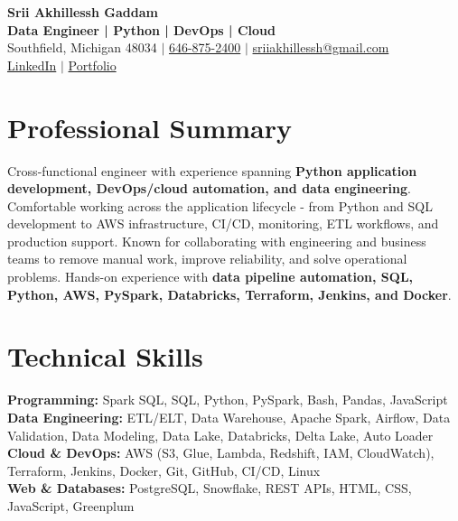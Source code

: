 \documentclass[letterpaper,10pt]{article}
\begin{document}
\fontsize{9.35pt}{10.45pt}\selectfont

\begin{center}
    {\LARGE \textbf{Srii Akhillessh Gaddam}} \\[-1pt]
    \textbf{Data Engineer | Python | DevOps | Cloud} \\[2pt]
    Southfield, Michigan 48034 $|$
    \href{tel:6468752400}{646-875-2400} $|$
    \href{mailto:sriiakhillessh@gmail.com}{sriiakhillessh@gmail.com} \\[1pt]
    \href{https://www.linkedin.com/in/srii-akhiilessh-gaddam-b48668191/}{LinkedIn} $|$
    \href{https://sriiakhillesshg.github.io/portfolio/}{Portfolio}
\end{center}
\vspace{-8pt}

\section{Professional Summary}
\small{Cross-functional engineer with experience spanning \textbf{Python application development, DevOps/cloud automation, and data engineering}. Comfortable working across the application lifecycle - from Python and SQL development to AWS infrastructure, CI/CD, monitoring, ETL workflows, and production support. Known for collaborating with engineering and business teams to remove manual work, improve reliability, and solve operational problems. Hands-on experience with \textbf{data pipeline automation, SQL, Python, AWS, PySpark, Databricks, Terraform, Jenkins, and Docker}.}

\section{Technical Skills}
\small{
\textbf{Programming:} Spark SQL, SQL, Python, PySpark, Bash, Pandas, JavaScript \\
\textbf{Data Engineering:} ETL/ELT, Data Warehouse, Apache Spark, Airflow, Data Validation, Data Modeling, Data Lake, Databricks, Delta Lake, Auto Loader \\
\textbf{Cloud \& DevOps:} AWS (S3, Glue, Lambda, Redshift, IAM, CloudWatch), Terraform, Jenkins, Docker, Git, GitHub, CI/CD, Linux \\
\textbf{Web \& Databases:} PostgreSQL, Snowflake, REST APIs, HTML, CSS, JavaScript, Greenplum
}
\end{document}
